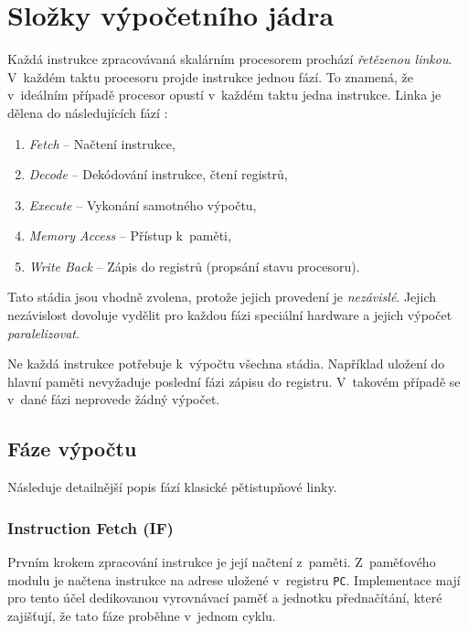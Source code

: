 \section{Složky výpočetního jádra}

Každá instrukce zpracovávaná skalárním procesorem prochází \emph{řetězenou linkou}.
V~každém taktu procesoru projde instrukce jednou fází.
To znamená, že v~ideálním případě procesor opustí v~každém taktu jedna instrukce.
Linka je dělena do následujících fází \cite{avs}:
\begin{enumerate}
    \item \emph{Fetch} -- Načtení instrukce,
    \item \emph{Decode} -- Dekódování instrukce, čtení registrů,
    \item \emph{Execute} -- Vykonání samotného výpočtu,
    \item \emph{Memory Access} -- Přístup k~paměti,
    \item \emph{Write Back} -- Zápis do registrů (propsání stavu procesoru).
\end{enumerate}

Tato stádia jsou vhodně zvolena, protože jejich provedení je \emph{nezávislé}.
Jejich nezávislost dovoluje vydělit pro každou fázi speciální hardware a jejich výpočet \emph{paralelizovat}.
\cite{OrganizationAndDesign}

Ne každá instrukce potřebuje k~výpočtu všechna stádia.
Například uložení do hlavní paměti nevyžaduje poslední fázi zápisu do registru.
V~takovém případě se v~dané fázi neprovede žádný výpočet. 

\subsection{Fáze výpočtu}
\label{fazeVypoctu}

Následuje detailnější popis fází klasické pětistupňové linky.

\subsubsection{Instruction Fetch (IF)}

Prvním krokem zpracování instrukce je její načtení z~paměti.
Z~paměťového modulu je načtena instrukce na adrese uložené v~registru \texttt{PC}.
Implementace mají pro tento účel dedikovanou vyrovnávací paměť a jednotku přednačítání, které zajišťují, že tato fáze proběhne v~jednom cyklu. \cite{avs}

